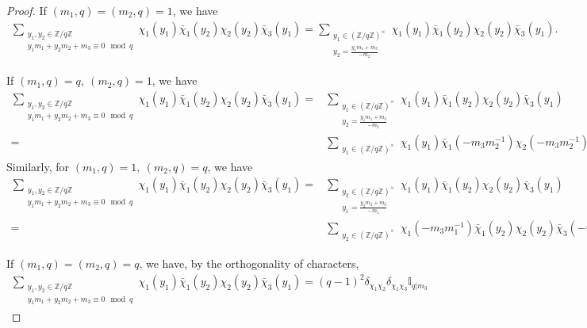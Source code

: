 \begin{proof}
    If $(m_1,q)=(m_2,q)=1$, we have \begin{align*}
        \sum_{\substack{y_1,y_2 \in\mathbb{Z}/q\mathbb{Z} \\ y_1m_1+y_2m_2+m_3\equiv 0 \mod q}}\chi_1(y_1)\bar{\chi}_1(y_2)\chi_2(y_2)\bar{\chi}_3(y_1)=
        \sum_{\substack{y_1\in (\mathbb{Z}/q\mathbb{Z})^\times\\y_2=\frac{y_1m_1+m_3}{-m_2}}}\chi_1(y_1)\bar{\chi}_1(y_2)\chi_2(y_2)\bar{\chi}_3(y_1).
    \end{align*}
    
    If $(m_1,q)=q, \ (m_2,q)=1$, we have \begin{align*}
        \sum_{\substack{y_1,y_2 \in\mathbb{Z}/q\mathbb{Z} \\ y_1m_1+y_2m_2+m_3\equiv 0 \mod q}}\chi_1(y_1)\bar{\chi}_1(y_2)\chi_2(y_2)\bar{\chi}_3(y_1)=&
        \sum_{\substack{y_1\in (\mathbb{Z}/q\mathbb{Z})^\times\\y_2=\frac{y_1m_1+m_3}{-m_2}}}\chi_1(y_1)\bar{\chi}_1(y_2)\chi_2(y_2)\bar{\chi}_3(y_1)\\
        =&\sum_{\substack{y_1\in (\mathbb{Z}/q\mathbb{Z})^\times}}\chi_1(y_1)\bar{\chi}_1(-m_3m_2^{-1})\chi_2(-m_3m_2^{-1})\bar{\chi}_3(y_1).
    \end{align*}
    Similarly, for $(m_1,q)=1, \ (m_2,q)=q$, we have\begin{align*}
        \sum_{\substack{y_1,y_2 \in\mathbb{Z}/q\mathbb{Z} \\ y_1m_1+y_2m_2+m_3\equiv 0 \mod q}}\chi_1(y_1)\bar{\chi}_1(y_2)\chi_2(y_2)\bar{\chi}_3(y_1)=&
        \sum_{\substack{y_2\in (\mathbb{Z}/q\mathbb{Z})^\times\\y_1=\frac{y_2m_2+m_3}{-m_1}}}\chi_1(y_1)\bar{\chi}_1(y_2)\chi_2(y_2)\bar{\chi}_3(y_1)\\
        =&\sum_{\substack{y_2\in (\mathbb{Z}/q\mathbb{Z})^\times}}\chi_1(-m_3m_1^{-1})\bar{\chi}_1(y_2)\chi_2(y_2)\bar{\chi}_3(-m_3m_1^{-1}).
    \end{align*}

    If $(m_1,q)=(m_2,q)=q$, we have, by the orthogonality of characters, \begin{align*}
        \sum_{\substack{y_1,y_2 \in\mathbb{Z}/q\mathbb{Z} \\ y_1m_1+y_2m_2+m_3\equiv 0 \mod q}}\chi_1(y_1)\bar{\chi}_1(y_2)\chi_2(y_2)\bar{\chi}_3(y_1)=(q-1)^2\delta_{\chi_1\chi_2}\delta_{\chi_1\chi_3}\mathbb{I}_{q|m_3}
    \end{align*}

\end{proof}
